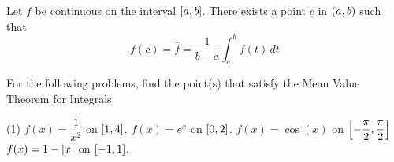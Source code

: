 \documentclass[mathNotesPreamble]{subfiles}
\begin{document}
\begin{thmBox*}
  Let $f$ be continuous on the interval ${\left[a,b\right]}$. There exists a point $c$ in ${\left(a,b\right)}$ such that 
    \[f(c)=\bar f=\frac{1}{b-a}\int_a^b f(t)\,dt\]
\end{thmBox*}

\begin{ex*}
  For the following problems, find the point(s) that satisfy the Mean Value Theorem for Integrals.
\end{ex*}
\begin{tasks}[after-item-skip=\stretch{1}](1)
  \task $f(x)=\dfrac{1}{x^2}$ on ${\left[1,4\right]}$.
  \task $f(x)=e^x$ on ${\left[0,2\right]}$.
  \task $f(x)=\cos(x)$ on ${\left[-\dfrac{\pi}{2},\dfrac{\pi}{2}\right]}$
  \task $f(x)=1-{\left\vert x\right\vert}$ on ${\left[-1,1\right]}$.
\end{tasks}
\pagebreak
\end{document}

